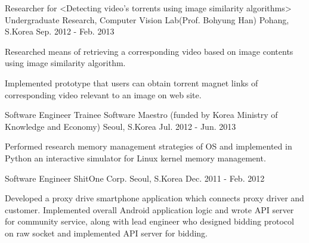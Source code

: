 \begin{cventries}
  \cventry
    {Researcher for <Detecting video’s torrents using image similarity algorithms>} %
    {Undergraduate Research, Computer Vision Lab(Prof. Bohyung Han)} %
    {Pohang, S.Korea} %
    {Sep. 2012 - Feb. 2013} %
    {
      \begin{cvitems} %
        \item {Researched means of retrieving a corresponding video based on image contents using image similarity algorithm.}
        \item {Implemented prototype that users can obtain torrent magnet links of corresponding video relevant to an image on web site.}
      \end{cvitems}
    }

  \cventry
    {Software Engineer Trainee} %
    {Software Maestro (funded by Korea Ministry of Knowledge and Economy)} %
    {Seoul, S.Korea} %
    {Jul. 2012 - Jun. 2013} %
    {
      \begin{cvitems} %
        \item {Performed research memory management strategies of OS and implemented in Python an interactive simulator for Linux kernel memory management.}
      \end{cvitems}
    }

  \cventry
    {Software Engineer} %
    {ShitOne Corp.} %
    {Seoul, S.Korea} %
    {Dec. 2011 - Feb. 2012} %
    {
      \begin{cvitems} %
        \item {Developed a proxy drive smartphone application which connects proxy driver and customer. Implemented overall Android application logic and wrote API server for community service, along with lead engineer who designed bidding protocol on raw socket and implemented API server for bidding.}
      \end{cvitems}
    }


\end{cventries}
